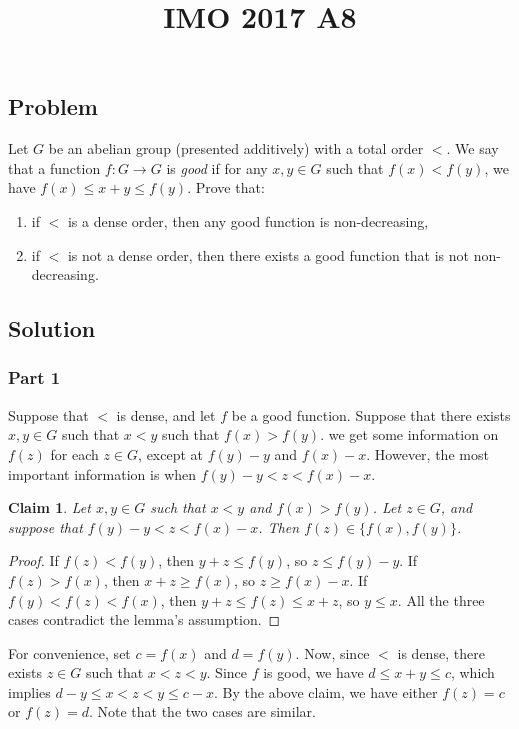 \documentclass{article}
\title{IMO 2017 A8}
\author{}
\date{}
\newtheorem*{claim}{Claim}
\begin{document}
\maketitle



\subsection*{Problem}

Let $G$ be an abelian group (presented additively) with a total order $<$.
We say that a function $f : G \to G$ is \emph{good} if for any $x, y \in G$ such that $f(x) < f(y)$, we have $f(x) \leq x + y \leq f(y)$.
Prove that:
\begin{enumerate}
    \item if $<$ is a dense order, then any good function is non-decreasing,
    \item if $<$ is not a dense order, then there exists a good function that is not non-decreasing.
\end{enumerate}


\subsection*{Solution}

\subsubsection*{Part 1}

Suppose that $<$ is dense, and let $f$ be a good function.
Suppose that there exists $x, y \in G$ such that $x < y$ such that $f(x) > f(y)$.
we get some information on $f(z)$ for each $z \in G$, except at $f(y) - y$ and $f(x) - x$.
However, the most important information is when $f(y) - y < z < f(x) - x$.

\begin{claim}
Let $x, y \in G$ such that $x < y$ and $f(x) > f(y)$.
Let $z \in G$, and suppose that $f(y) - y < z < f(x) - x$.
Then $f(z) \in \{f(x), f(y)\}$.
\end{claim}
\begin{proof}
If $f(z) < f(y)$, then $y + z \leq f(y)$, so $z \leq f(y) - y$.
If $f(z) > f(x)$, then $x + z \geq f(x)$, so $z \geq f(x) - x$.
If $f(y) < f(z) < f(x)$, then $y + z \leq f(z) \leq x + z$, so $y \leq x$.
All the three cases contradict the lemma's assumption.
\end{proof}

For convenience, set $c = f(x)$ and $d = f(y)$.
Now, since $<$ is dense, there exists $z \in G$ such that $x < z < y$.
Since $f$ is good, we have $d \leq x + y \leq c$, which implies $d - y \leq x < z < y \leq c - x$.
By the above claim, we have either $f(z) = c$ or $f(z) = d$.
Note that the two cases are similar.
\end{document}
